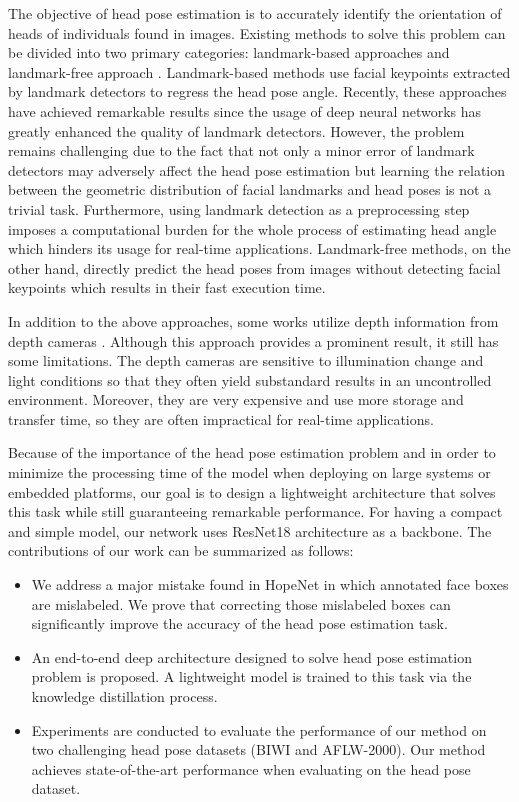 \documentclass[a4paper,twoside]{article}
\begin{document}
The objective of head pose estimation is to accurately identify the orientation of heads of individuals found in images. Existing methods to solve this problem can be divided into two primary categories: landmark-based approaches \cite{cao2014face,lathuiliere2017deep,fanelli2011real,xiong2015global,sun2013deep,xin2021eva,bulat2017far,dementhon1995model} and landmark-free approach \cite{ruiz2018fine,yang2019fsa,zhou2020whenet,chang2017faceposenet}. Landmark-based methods use facial keypoints extracted by landmark detectors to regress the head pose angle. Recently, these approaches have achieved remarkable results since the usage of deep neural networks has greatly enhanced the quality of landmark detectors. However, the problem remains challenging due to the fact that not only a minor error of landmark detectors may adversely affect the head pose estimation but learning the relation between the geometric distribution of facial landmarks and head poses is not a trivial task. Furthermore, using landmark detection as a preprocessing step imposes a computational burden for the whole process of estimating head angle which hinders its usage for real-time applications. Landmark-free methods, on the other hand, directly predict the head poses from images without detecting facial keypoints which results in their fast execution time.

In addition to the above approaches, some works utilize depth information from depth cameras \cite{meyer2015robust,fanelli2011real,mukherjee2015deep,martin2014real}. Although this approach provides a prominent result, it still has some limitations. The depth cameras are sensitive to illumination change and light conditions so that they often yield substandard results in an uncontrolled environment. Moreover, they are very expensive and use more storage and transfer time, so they are often impractical for real-time applications.

Because of the importance of the head pose estimation problem and in order to minimize the processing time of the model when deploying on large systems or embedded platforms, our goal is to design a lightweight architecture that solves this task while still guaranteeing remarkable performance. For having a compact and simple model, our network uses ResNet18 architecture as a backbone. The contributions of our work can be summarized as follows:
\begin{itemize}
\item We address a major mistake found in HopeNet \cite{ruiz2018fine} in which annotated face boxes are mislabeled. We prove that correcting those mislabeled boxes can significantly improve the accuracy of the head pose estimation task.
\item An end-to-end deep architecture designed to solve head pose estimation problem is proposed. A lightweight model is trained to this task via the knowledge distillation process.
\item Experiments are conducted to evaluate the performance of our method on two challenging head pose datasets (BIWI and AFLW-2000). Our method achieves state-of-the-art performance when evaluating on the head pose dataset.
\end{itemize}
\end{document}
